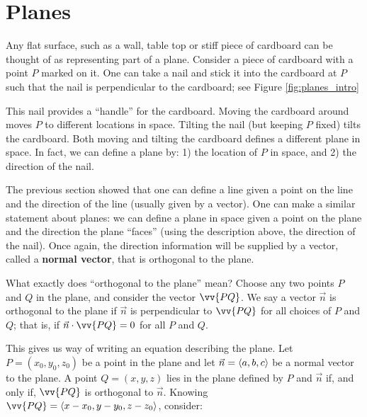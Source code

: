 \section{Planes}\label{sec:planes}

Any flat surface, such as a wall, table top or stiff piece of cardboard can be thought of as representing part of a plane. Consider a piece of cardboard with a point $P$ marked on it. One can take a nail and stick it into the cardboard at $P$ such that the nail is perpendicular to the cardboard; see Figure \ref{fig:planes_intro}%

This nail provides a ``handle'' for the cardboard. Moving the cardboard around moves $P$ to different locations in space. Tilting the nail (but keeping $P$ fixed) tilts the cardboard. Both moving and tilting the cardboard defines a different plane in space. In fact, we can define a plane by: 1) the location of $P$ in space, and 2) the direction of the nail.

The previous section showed that one can define a line given a point on the line and the direction of the line (usually given by a vector). One can make a similar statement about planes: we can define a plane in space given a point on the plane and the direction the plane ``faces'' (using the description above, the direction of the nail). Once again, the direction information will be supplied by a vector, called a \textbf{normal vector}, that is orthogonal to the plane.

What exactly does ``orthogonal to the plane'' mean? Choose any two points $P$ and $Q$ in the plane, and consider the vector $\vv{PQ}$. We say a vector $\vec n$ is orthogonal to the plane if $\vec n$ is perpendicular to $\vv{PQ}$ for all choices of $P$ and $Q$; that is, if $\vec n\cdot \vv{PQ}=0$ for all $P$ and $Q$.

This gives us way of writing an equation describing the plane. Let $P=(x_0,y_0,z_0)$ be a point in the plane and let $\vec n = \left\langle a,b,c\right\rangle $ be a normal vector to the plane. A point $Q = (x,y,z)$ lies in the plane defined by $P$ and $\vec n$ if, and only if, $\vv{PQ}$ is orthogonal to $\vec n$. Knowing $\vv{PQ} = \la x-x_0,y-y_0,z-z_0\ra$, consider:

